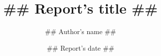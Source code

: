 \documentclass[a4paper]{Informe_style}
\begin{document}
\title{## Report's title ##}
\author{## Author's name ##}
\date{## Report's date ##}

\maketitle

\setcounter{page}{1}




%
%
\end{document}

